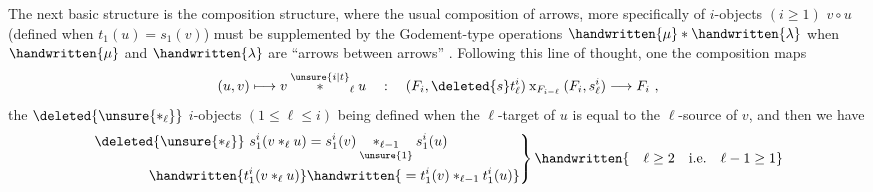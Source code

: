 The next basic structure is the composition structure, where the usual composition of arrows, more specifically of $i$-objects $(i\geq1)$ $v\circ u$ (defined when $t_1(u)=s_1(v)$) must be supplemented by the Godement-type operations $\handwritten{\mu}*\handwritten{\lambda}$ when $\handwritten{\mu}$ and $\handwritten{\lambda}$ are ``arrows between arrows''  . Following this line of thought, one  the composition maps
\[
(u,v)\longmapsto v\overset{\unsure{i|t}}{*}_\ell u\quad:\quad (F_i,\deleted{s}t^i_\ell)\mathbin{\mathrm{x}}_{F_{i-\ell}}(F_i,s^i_\ell)\longrightarrow F_i\ ,
\]
the $\deleted{\unsure{*_\ell}}$  $i$-objects  $(1\leq\ell\leq i)$ being defined when the $\ell$-target of $u$ is equal to the $\ell$-source of $v$, and then we have
\[
\left.\begin{aligned}
\deleted{\unsure{*_\ell}}\ s^i_1(v*_\ell u)&=s^i_1(v)\underset{\unsure{1}}{*_{\ell-1}}s^i_1(u)\\
\handwritten{t^i_1(v*_\ell u)}&\handwritten{{}=t^i_1(v)*_{\ell-1}t^i_1(u)}
\end{aligned}\right\}\handwritten{\quad\ell\geq2\quad\text{i.e.}\quad\ell-1\geq1}
\]
